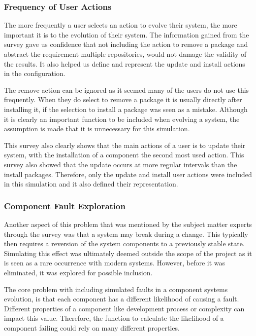 \subsubsection{Frequency of User Actions}
The more frequently a user selects an action to evolve their system, the more important it is to the evolution of their system.
The information gained from the survey gave us confidence that not including the action to remove a package and abstract the requirement multiple repositories, 
would not damage the validity of the results.
It also helped us define and represent the update and install actions in the configuration.

The remove action can be ignored as it seemed many of the users do not use this frequently.
When they do select to remove a package it is usually directly after installing it, if the selection to install a package was seen as a mistake.
Although it is clearly an important function to be included when evolving a system, the assumption is made that it is unnecessary for this simulation.

This survey also clearly shows that the main actions of a user is to update their system,
with the installation of a component the second most used action.
This survey also showed that the update occurs at more regular intervals than the install packages.
Therefore, only the update and install user actions were included in this simulation and it also defined their representation. 

\subsubsection{Component Fault Exploration}
Another aspect of this problem that was mentioned by the subject matter experts through the survey was that a system may break during a change.
This typically then requires a reversion of the system components to a previously stable state.
Simulating this effect was ultimately deemed outside the scope of the project as it is seen as a rare occurrence with modern systems.
However, before it was eliminated, it was explored for possible inclusion.

The core problem with including simulated faults in a component systems evolution, is that each component has a different likelihood of causing a fault.
Different properties of a component like development process or complexity can impact this value.
Therefore, the function to calculate the likelihood of a component failing could rely on many different properties.

